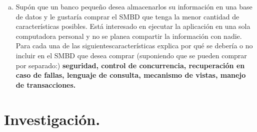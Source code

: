 \documentclass[letterpaper,12pt]{article}
\begin{document}
\begin{enumerate}[a. ]
            \item Supón que un banco pequeño desea almacenarlos su información en una base de datos y le gustaría comprar el SMBD que tenga la menor cantidad de características posibles. Está interesado en ejecutar la aplicación en una sola computadora personal y no se planea compartir la información con nadie. Para cada una de las siguientescaracterísticas explica por qué se debería o no incluir en el SMBD que desea comprar (suponiendo que se pueden comprar por separado:) \textbf{seguridad, control de concurrencia, recuperación en caso de fallas, lenguaje de consulta, mecanismo de vistas, manejo de transacciones.} \\
          \end{enumerate}

            \section{Investigación.}
\end{document}
